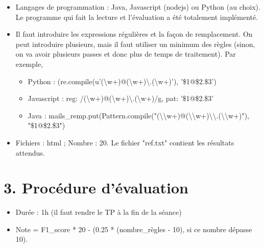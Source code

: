 \documentclass[11pt, a4paper]{article}
\begin{document}
\begin{itemize}
	\item Langages de programmation : Java, Javascript (nodejs) ou Python (au choix).  
	Le programme qui fait la lecture et l'évaluation a été totalement implémenté.
	\item Il faut introduire les expressions régulières et la façon de remplacement.
	On peut introduire plusieurs, mais il faut utiliser un minimum des règles (sinon, on va avoir plusieurs passes et donc plus de temps de traitement). 
	Par exemple, 
	\begin{itemize}
		\item Python : (re.compile(u'(\textbackslash w+)@(\textbackslash w+)\textbackslash .(\textbackslash w+)'), '\$1@\$2.\$3')
		\item Javascript : {reg: /(\textbackslash w+)@(\textbackslash w+)\textbackslash.(\textbackslash w+)/g, pat: '\$1@\$2.\$3'}
		\item Java : mails\_remp.put(Pattern.compile("(\textbackslash\textbackslash w+)@(\textbackslash\textbackslash w+)\textbackslash\textbackslash.(\textbackslash\textbackslash w+)"), "\$1@\$2.\$3")
	\end{itemize}
	\item Fichiers : html ; Nombre : 20. Le fichier "ref.txt" contient les résultats attendus.
\end{itemize}

\section*{3. Procédure d'évaluation}

\begin{itemize}
	\item Durée : 1h (il faut rendre le TP à la fin de la séance)
	\item Note = F1\_score * 20 - (0.25 * (nombre\_règles - 10), si ce nombre dépasse 10).
\end{itemize}
\end{document}
